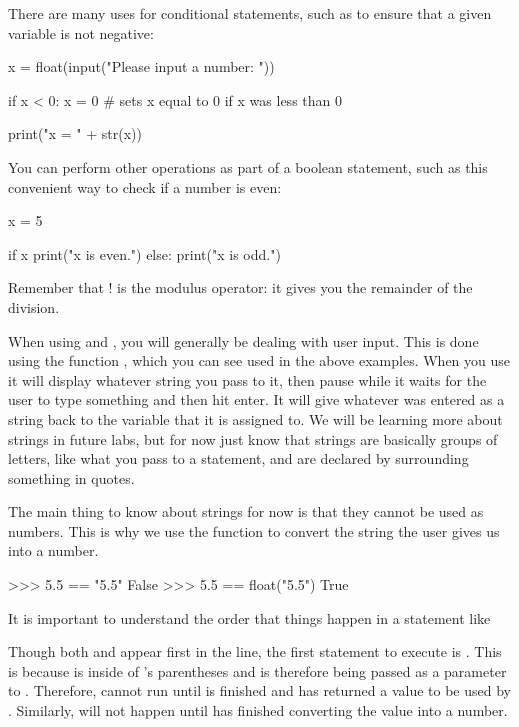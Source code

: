 \documentclass[11pt]{cselabheader}
\begin{document}
There are many uses for conditional statements, such as to ensure that a given
variable is not negative:

\begin{python3code}
x = float(input("Please input a number: "))

if x < 0:
    x = 0 # sets x equal to 0 if x was less than 0

print("x = " + str(x))
\end{python3code}

You can perform other operations as part of a boolean statement, such as this
convenient way to check if a number is even:

\begin{python3code}
x = 5

if x %
    print("x is even.")
else:
    print("x is odd.")
\end{python3code}

Remember that \pythoninline!%
is the modulus operator: it gives you the remainder of the division.

When using  and , you will generally be
dealing with user input. This is done using the function ,
which you can see used in the above examples. When you use 
it will display whatever string you pass to it, then pause while it waits for
the user to type something and then hit enter. It will give whatever was entered
as a string back to the variable that it is assigned to. We will be learning
more about strings in future labs, but for now just know that strings are
basically groups of letters, like what you pass to a 
statement, and are declared by surrounding something in quotes.

The main thing to know about strings for now is that they cannot be used as
numbers. This is why we use the  function to convert the
string the user gives us into a number.

\begin{pyconcode}
>>> 5.5 == "5.5"
False
>>> 5.5 == float("5.5")
True
\end{pyconcode}

It is important to understand the order that things happen in a statement like


Though both  and  appear first in the line, the
first statement to execute is . This is because
 is inside of 's parentheses and is therefore
being passed as a parameter to . Therefore, 
cannot run until  is finished and has returned a value to be
used by . Similarly,  will not happen until
 has finished converting the value into a number.
\end{document}
